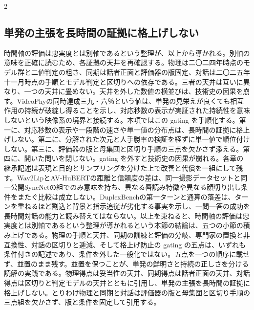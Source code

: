 \documentclass[lualatex,a4paper,10pt]{jlreq}
\begin{document}
\begin{multicols}{2}
\subsection{単発の主張を長時間の証拠に格上げしない}
時間軸の評価は忠実度とは別軸であるという整理が、以上から導かれる\autocite{btd131,btd129,btd130,btd135}。別軸の意味を正確に読むため、各証拠の天井を再確認する。物理は二〇二四年時点のモデル群と二値判定の粗さ、同期は話者正面と評価器の版固定、対話は二〇二五年十一月時点の手順とモデル判定と区切りへの依存である。三者の天井は互いに異なり、一つの天井に畳めない。天井を外した数値の横並びは、技術史の因果を崩す。VideoPhyの同時達成三九・六％という値は、単発の見栄えが良くても相互作用の持続が破綻し得ることを示し、対応秒数の表示が実証された持続性を意味しないという映像系の境界と接続する\autocite{btd131}。本項ではこの gating を手順化する。第一に、対応秒数の表示や一段階の速さや単一値の分布点は、長時間の証拠に格上げしない。第二に、分解された次元と人手勝率の検証を経ずに単一値で順位付けしない。第三に、評価器の版と母集団と区切り手順の三点を欠かさず添える。第四に、開いた問いを閉じない。gating を外すと技術史の因果が崩れる。各章の継承記述は表現と目的とサンプリングを分けた上で改善と代償を一組にして残す\autocite{btd131,btd135}。Wav2LipとAV-HuBERTの距離と信頼度の差は、同一撮影データセットと同一公開SyncNetの組でのみ意味を持ち、異なる唇読み特徴や異なる顔切り出し条件をまたぐ比較は成立しない\autocite{btd129,btd130}。DuplexBenchの第一ターンと通算の落差は、ターンを重ねるほど割込と背景と指示追従が劣化する事実を示し、一問一答の成功を長時間対話の能力と読み替えてはならない\autocite{btd135}。以上を束ねると、時間軸の評価は忠実度とは別軸であるという整理が導かれるという本節の結論は、五つの小節の積み上げである\autocite{btd131,btd129,btd130,btd135}。物理の手順と天井、同期の訓練と評価の分岐、専門家の置換と非互換性、対話の区切りと逓減、そして格上げ防止の gating の五点は、いずれも条件付きの記述であり、条件を外した一般化ではない。五点を一つの順序に載せず、並置のまま残す。並置を保つことが、単発の鮮明さと持続の正しさを分ける読解の実践である。物理得点は妥当性の天井、同期得点は話者正面の天井、対話得点は区切りと判定モデルの天井とともに引用し、単発の主張を長時間の証拠に格上げしない。とりわけ物理と同期と対話は評価器の版と母集団と区切り手順の三点組を欠かさず、版と条件を固定して引用する。
\end{multicols}
\end{document}
